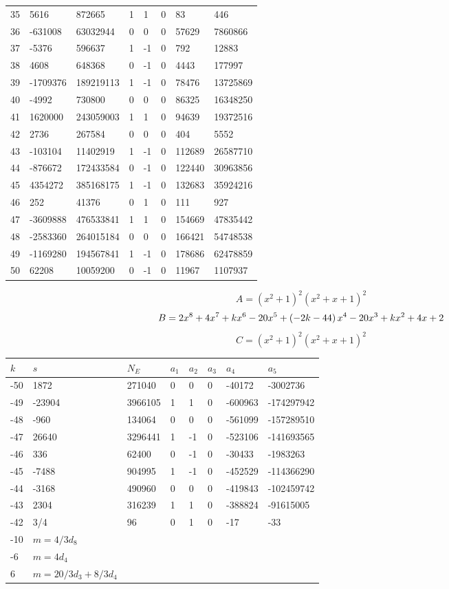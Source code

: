 \documentclass{amsart}
\begin{document}
\begin{longtable}{|l|l|l|lllll|}
35&5616&872665&1&1&0&83&446\\
36&-631008&63032944&0&0&0&57629&7860866\\
37&-5376&596637&1&-1&0&792&12883\\
38&4608&648368&0&-1&0&4443&177997\\
39&-1709376&189219113&1&-1&0&78476&13725869\\
40&-4992&730800&0&0&0&86325&16348250\\
41&1620000&243059003&1&1&0&94639&19372516\\
42&2736&267584&0&0&0&404&5552\\
43&-103104&11402919&1&-1&0&112689&26587710\\
44&-876672&172433584&0&-1&0&122440&30963856\\
45&4354272&385168175&1&-1&0&132683&35924216\\
46&252&41376&0&1&0&111&927\\
47&-3609888&476533841&1&1&0&154669&47835442\\
48&-2583360&264015184&0&0&0&166421&54748538\\
49&-1169280&194567841&1&-1&0&178686&62478859\\
50&62208&10059200&0&-1&0&11967&1107937\\
\hline
\end{longtable}
$$A=(x^2
 + 1)^{2}(x^2
 + x
 + 1)^{2}$$
$$B=2\*x^8
 + 4\*x^7
 + k\*x^6
 - 20\*x^5
 + \left(-2\*k
 - 44\right) \*x^4
 - 20\*x^3
 + k\*x^2
 + 4\*x
 + 2$$
$$C=(x^2
 + 1)^{2}(x^2
 + x
 + 1)^{2}$$
\begin{longtable}{|l|l|l|lllll|}
\hline
$k$ & $s$ & $N_E$ & $a_1$ & $a_2$ & $a_3$ & $a_4$ & $a_5$\\
\hline
-50&1872&271040&0&0&0&-40172&-3002736\\
-49&-23904&3966105&1&1&0&-600963&-174297942\\
-48&-960&134064&0&0&0&-561099&-157289510\\
-47&26640&3296441&1&-1&0&-523106&-141693565\\
-46&336&62400&0&-1&0&-30433&-1983263\\
-45&-7488&904995&1&-1&0&-452529&-114366290\\
-44&-3168&490960&0&0&0&-419843&-102459742\\
-43&2304&316239&1&1&0&-388824&-91615005\\
-42&3/4&96&0&1&0&-17&-33\\
-10&$m=4/3d_{8}$&&\multicolumn{5}{c|}{}\\
-6&$m=4d_{4}$&&\multicolumn{5}{c|}{}\\
6&$m=20/3d_{3}+8/3d_{4}$&&\multicolumn{5}{c|}{}\\
\hline
\end{longtable}
\end{document}
